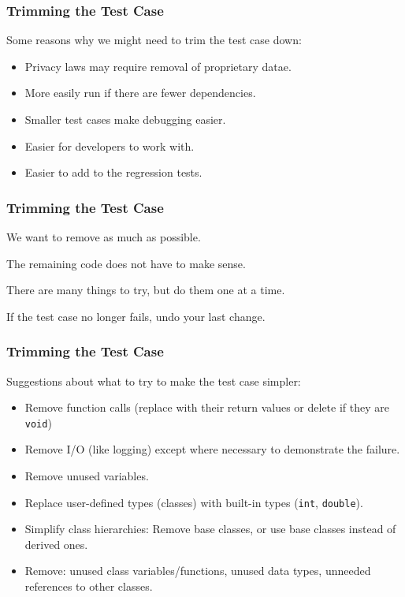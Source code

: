\begin{frame}
\frametitle{Trimming the Test Case}
\begin{changemargin}{1cm}

Some reasons why we might need to trim the test case down:

\begin{itemize}
	\item Privacy laws may require removal of proprietary datae.
	\item More easily run if there are fewer dependencies.
	\item Smaller test cases make debugging easier.
	\item Easier for developers to work with.
	\item Easier to add to the regression tests.
\end{itemize}

\end{changemargin}
\end{frame}

\begin{frame}
\frametitle{Trimming the Test Case}
\begin{changemargin}{1cm}

We want to remove as much as possible.

The remaining code does not have to make sense.

There are many things to try, but do them one at a time.

If the test case no longer fails, undo your last change.

\end{changemargin}
\end{frame}


\begin{frame}
\frametitle{Trimming the Test Case}
\begin{changemargin}{1cm}

Suggestions about what to try to make the test case simpler:

\begin{itemize}
	\item Remove function calls (replace with their return values or delete if they are \texttt{void})
	\item Remove I/O (like logging) except where necessary to demonstrate the failure.
	\item Remove unused variables.
	\item Replace user-defined types (classes) with built-in types (\texttt{int}, \texttt{double}).
	\item Simplify class hierarchies: Remove base classes, or use base classes instead of derived ones.
	\item Remove: unused class variables/functions, unused data types, unneeded references to other classes.
\end{itemize}

\end{changemargin}
\end{frame}






